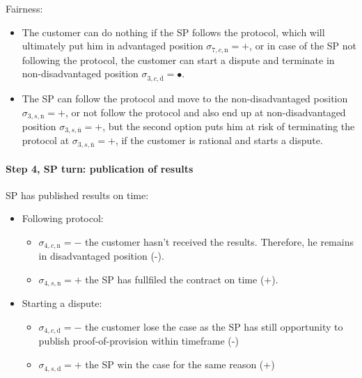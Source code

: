 \documentclass{ieeeaccess}
\begin{document}
Fairness:

\begin{itemize}

\item
  The customer can do nothing if the SP follows the protocol, which will
  ultimately put him in advantaged position
  \(\sigma_{7, c, \mathrm{n}} = +\), or in case of the SP not following
  the protocol, the customer can start a dispute and terminate in
  non-disadvantaged position
  \(\sigma_{3, c, \overline{\mathrm{d}}} = •\).
\item
  The SP can follow the protocol and move to the non-disadvantaged
  position \(\sigma_{3, s, \mathrm{n}} = +\), or not follow the protocol
  and also end up at non-disadvantaged position
  \(\sigma_{3, s, \overline{\mathrm{n}}} = +\), but the second option
  puts him at risk of terminating the protocol at
  \(\sigma_{3, s, \overline{\mathrm{n}}} = +\), if the customer is
  rational and starts a dispute.
\end{itemize}

\paragraph{Step 4, SP turn: publication of
results}\label{step-4-publication-of-results}

SP has published results on time:

\begin{itemize}
\item
  Following protocol:

  \begin{itemize}
  
  \item
    \(\sigma_{4, c, \mathrm{n}} = -\) the customer hasn't received the
    results. Therefore, he remains in disadvantaged position (-).
  \item
    \(\sigma_{4, s, \mathrm{n}} = +\) the SP has fullfiled the contract
    on time (+).
  \end{itemize}
\item
  Starting a dispute:

  \begin{itemize}
  
  \item
    \(\sigma_{4, c, \mathrm{d}} = -\) the customer lose the case as the
    SP has still opportunity to publish proof-of-provision within
    timeframe (-)
  \item
    \(\sigma_{4, s, \mathrm{d}} = +\) the SP win the case for the same
    reason (+)
  \end{itemize}
\end{itemize}
\end{document}
